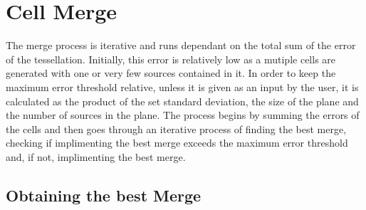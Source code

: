 \section{Cell Merge}

The merge process is iterative and runs dependant on the total sum of the error of the tessellation. Initially, this error is relatively low as a mutiple cells are generated with one or very few sources contained in it. In order to keep the maximum error threshold relative, unless it is given as an input by the user, it is calculated as the product of the set standard deviation, the size of the plane and the number of sources in the plane. The process begins by summing the errors of the cells and then goes through an iterative process of finding the best merge, checking if implimenting the best merge exceeds the maximum error threshold and, if not, implimenting the best merge.

\subsection{Obtaining the best Merge}
